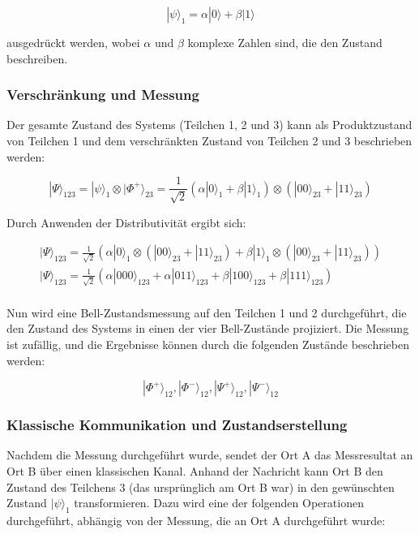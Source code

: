 \[
|\psi\rangle_1 = \alpha |0\rangle + \beta |1\rangle
\]

ausgedrückt werden, wobei \(\alpha\) und \(\beta\) komplexe Zahlen sind, die den Zustand beschreiben.

\subsubsection{Verschränkung und Messung}

Der gesamte Zustand des Systems (Teilchen 1, 2 und 3) kann als Produktzustand von Teilchen 1 und dem verschränkten Zustand von Teilchen 2 und 3 beschrieben werden:

\[
|\Psi\rangle_{123} = |\psi\rangle_1 \otimes |\Phi^+\rangle_{23} = \frac{1}{\sqrt{2}} \left( \alpha |0\rangle_1 + \beta |1\rangle_1 \right) \otimes \left( |00\rangle_{23} + |11\rangle_{23} \right)
\]

Durch Anwenden der Distributivität ergibt sich:

\begin{gather*}
    |\Psi\rangle_{123} = \frac{1}{\sqrt{2}} \left( \alpha |0\rangle_1 \otimes (|00\rangle_{23} + |11\rangle_{23}) + \beta |1\rangle_1 \otimes (|00\rangle_{23} + |11\rangle_{23}) \right)\\
    |\Psi\rangle_{123} = \frac{1}{\sqrt{2}} \left( \alpha |000\rangle_{123} + \alpha |011\rangle_{123} + \beta |100\rangle_{123} + \beta |111\rangle_{123} \right)\\
\end{gather*}

Nun wird eine Bell-Zustandsmessung auf den Teilchen 1 und 2 durchgeführt, die den Zustand des Systems in einen der vier Bell-Zustände projiziert. Die Messung ist zufällig, und die Ergebnisse können durch die folgenden Zustände beschrieben werden:

\[
|\Phi^+\rangle_{12}, |\Phi^-\rangle_{12}, |\Psi^+\rangle_{12}, |\Psi^-\rangle_{12}
\]

\subsubsection*{Klassische Kommunikation und Zustandserstellung}

Nachdem die Messung durchgeführt wurde, sendet der Ort A das Messresultat an Ort B über einen klassischen Kanal.
Anhand der Nachricht kann Ort B den Zustand des Teilchens 3 (das ursprünglich am Ort B war) in den gewünschten Zustand \(|\psi\rangle_1\) transformieren. Dazu wird eine der folgenden Operationen durchgeführt, abhängig von der Messung, die an Ort A durchgeführt wurde:

